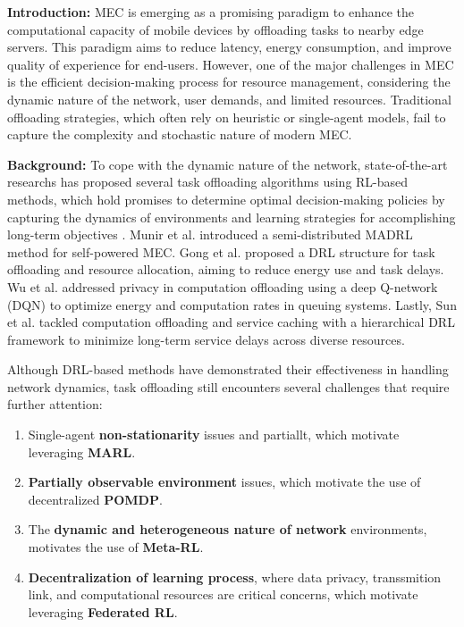 \documentclass[12pt]{article}
\begin{document}
	
\vspace{-1mm}
\noindent\large\textbf{Introduction: }
\small
MEC is emerging as a promising paradigm to enhance the computational capacity of mobile devices by offloading tasks to nearby edge servers. This paradigm aims to reduce latency, energy consumption, and improve quality of experience for end-users. However, one of the major challenges in MEC is the efficient decision-making process for resource management, considering the dynamic nature of the network, user demands, and limited resources. Traditional offloading strategies, which often rely on heuristic or single-agent models, fail to capture the complexity and stochastic nature of modern MEC. \\\vspace{-3mm}


\noindent\large\textbf{Background: }\small
To cope with the dynamic nature of the network, state-of-the-art researchs has proposed several task offloading algorithms using RL-based methods, which hold promises to determine optimal decision-making policies by capturing the dynamics of environments and learning strategies for accomplishing long-term objectives \cite{arulkumaran2017deep}. Munir et al. introduced a semi-distributed MADRL method for self-powered MEC. Gong et al. proposed a DRL structure for task offloading and resource allocation, aiming to reduce energy use and task delays. Wu et al. addressed privacy in computation offloading using a deep Q-network (DQN) to optimize energy and computation rates in queuing systems. Lastly, Sun et al. tackled computation offloading and service caching with a hierarchical DRL framework to minimize long-term service delays across diverse resources.

 	Although DRL-based methods have demonstrated their effectiveness in handling network dynamics, task offloading still encounters several challenges that require further attention: \vspace{0mm}
 	 	\begin{enumerate}
 		\item  Single-agent \textbf{non-stationarity} issues \cite{hernandez2017survey} and partiallt, which motivate leveraging \textbf{MARL}. \vspace{-1.5mm}
 		
 		\item \textbf{Partially observable environment} issues, which motivate the use of decentralized \textbf{POMDP}.\vspace{-1.5mm}
 		
 		\item The \textbf{dynamic and heterogeneous nature of network} environments, motivates the use of \textbf{Meta-RL}.\vspace{-1.5mm}
 		
 		\item \textbf{Decentralization of learning process}, where data privacy, transsmition link, and computational resources are critical concerns, which motivate leveraging \textbf{Federated RL}.
 	\end{enumerate}
 	
\end{document}
